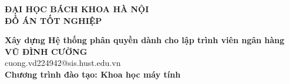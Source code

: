 \documentclass[DoAn.tex]{subfiles}
\begin{document}
\begin{titlepage}
\thispagestyle{empty}
\begin{center}

{\textbf{\large{ĐẠI HỌC BÁCH KHOA HÀ NỘI}}}\\[2.5cm]

{\textbf{\huge{ ĐỒ ÁN TỐT NGHIỆP}}}\\[1cm]
{\textbf{\Large{Xây dựng Hệ thống phân quyền dành cho lập trình viên ngân hàng}}\\[1cm]

{\textbf{\large{VŨ ĐÌNH CƯỜNG}}}\\
{\large{cuong.vd224942@sis.hust.edu.vn}}\\[0.5cm]

{\textbf{\large{Chương trình đào tạo: Khoa học máy tính
}}}\\

\vspace{2.5cm}
\begin{table}[H]
\centering
{}
\end{table}}
\end{center}



\end{titlepage}
\end{document}
